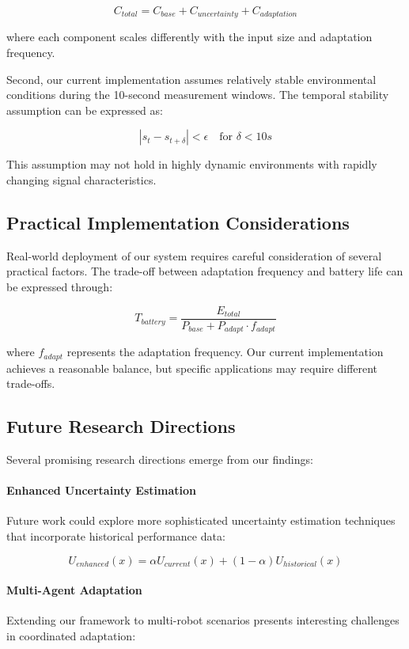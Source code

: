 \documentclass[12pt]{article}
\begin{document}
\[
C_{total} = C_{base} + C_{uncertainty} + C_{adaptation}
\]

where each component scales differently with the input size and adaptation frequency.

Second, our current implementation assumes relatively stable environmental conditions during the 10-second measurement windows. The temporal stability assumption can be expressed as:

\[
|s_t - s_{t+\delta}| < \epsilon \quad \text{for } \delta < 10s
\]

This assumption may not hold in highly dynamic environments with rapidly changing signal characteristics.


\subsection{Practical Implementation Considerations}
Real-world deployment of our system requires careful consideration of several practical factors. The trade-off between adaptation frequency and battery life can be expressed through:

\[
T_{battery} = \frac{E_{total}}{P_{base} + P_{adapt} \cdot f_{adapt}}
\]

where \(f_{adapt}\) represents the adaptation frequency. Our current implementation achieves a reasonable balance, but specific applications may require different trade-offs.

\subsection{Future Research Directions}
Several promising research directions emerge from our findings:

\paragraph{Enhanced Uncertainty Estimation}
Future work could explore more sophisticated uncertainty estimation techniques that incorporate historical performance data:

\[
U_{enhanced}(x) = \alpha U_{current}(x) + (1-\alpha)U_{historical}(x)
\]

\paragraph{Multi-Agent Adaptation}
Extending our framework to multi-robot scenarios presents interesting challenges in coordinated adaptation:
\end{document}
